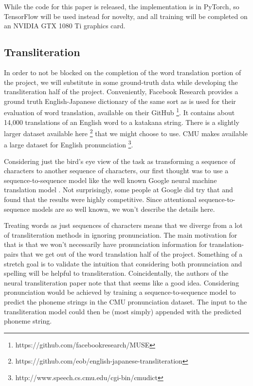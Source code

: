 \documentclass{article}
\begin{document}
While the code for this paper is released, the implementation is in PyTorch, so
TensorFlow will be used instead for novelty, and all training will be completed on an
NVIDIA GTX 1080 Ti graphics card.

\subsection*{Transliteration}

In order to not be blocked on
the completion of the word translation portion of the project,
we will substitute in some ground-truth data
while developing the transliteration half of the project.
Conveniently,
Facebook Research provides a ground truth English-Japanese dictionary
of the same sort as is used for their evaluation of word translation,
available on their GitHub
\footnote{https://github.com/facebookresearch/MUSE}.
It contains about 14,000 translations of an English word to a katakana string.
There is a slightly larger dataset available here
\footnote{https://github.com/eob/english-japanese-transliteration}
that we might choose to use.
CMU makes available a large dataset for English pronunciation
\footnote{http://www.speech.cs.cmu.edu/cgi-bin/cmudict}.

Considering just the bird's eye view of the task
as transforming a sequence of characters to another sequence of characters,
our first thought was to use a sequence-to-sequence model
like the well known Google neural machine translation model
\cite{Wu2016GooglesNM}.
Not surprisingly,
some people at Google did try that \cite{Rosca2016SequencetosequenceNN}
and found that the results were highly competitive.
Since attentional sequence-to-sequence models \cite{Bahdanau2015NeuralMT}
are so well known,
we won't describe the details here.

Treating words as just sequences of characters
means that we diverge from a lot of transliteration methods
in ignoring pronunciation.
The main motivation for that
is that we won't necessarily have pronunciation information for translation-pairs
that we get out of the word translation half of the project.
Something of a stretch goal is to validate the intuition
that considering both pronunciation and spelling will be helpful to transliteration.
Coincidentally,
the authors of the neural transliteration paper \cite{Rosca2016SequencetosequenceNN}
note that that seems like a good idea.
Considering pronunciation would be achieved by
training a sequence-to-sequence model to predict
the phoneme strings in the CMU pronunciation dataset.
The input to the transliteration model could then be
(most simply) appended with the predicted phoneme string.
\end{document}
